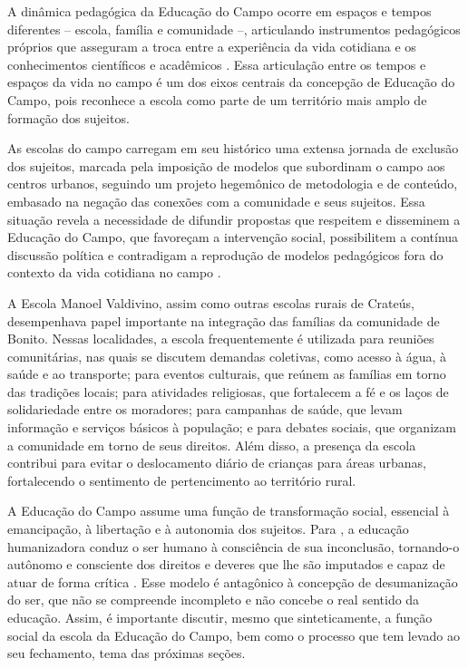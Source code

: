 \documentclass[
  12pt,
  openright,
  twoside,
  a4paper,
  english,
  brazilian,
  sumario=tradicional
]{abntex2}
\begin{document}
A dinâmica pedagógica da Educação do Campo ocorre em espaços e tempos diferentes -- escola, família e comunidade --, articulando instrumentos pedagógicos próprios que asseguram a troca entre a experiência da vida cotidiana e os conhecimentos científicos e acadêmicos \cite{molinafreitas2011}. Essa articulação entre os tempos e espaços da vida no campo é um dos eixos centrais da concepção de Educação do Campo, pois reconhece a escola como parte de um território mais amplo de formação dos sujeitos.

As escolas do campo carregam em seu histórico uma extensa jornada de exclusão dos sujeitos, marcada pela imposição de modelos que subordinam o campo aos centros urbanos, seguindo um projeto hegemônico de metodologia e de conteúdo, embasado na negação das conexões com a comunidade e seus sujeitos. Essa situação revela a necessidade de difundir propostas que respeitem e disseminem a Educação do Campo, que favoreçam a intervenção social, possibilitem a contínua discussão política e contradigam a reprodução de modelos pedagógicos fora do contexto da vida cotidiana no campo \cite{arroyocaldartmolina2011}.

A Escola Manoel Valdivino, assim como outras escolas rurais de Crateús, desempenhava papel importante na integração das famílias da comunidade de Bonito. Nessas localidades, a escola frequentemente é utilizada para reuniões comunitárias, nas quais se discutem demandas coletivas, como acesso à água, à saúde e ao transporte; para eventos culturais, que reúnem as famílias em torno das tradições locais; para atividades religiosas, que fortalecem a fé e os laços de solidariedade entre os moradores; para campanhas de saúde, que levam informação e serviços básicos à população; e para debates sociais, que organizam a comunidade em torno de seus direitos. Além disso, a presença da escola contribui para evitar o deslocamento diário de crianças para áreas urbanas, fortalecendo o sentimento de pertencimento ao território rural.

A Educação do Campo assume uma função de transformação social, essencial à emancipação, à libertação e à autonomia dos sujeitos. Para , a educação humanizadora conduz o ser humano à consciência de sua inconclusão, tornando-o autônomo e consciente dos direitos e deveres que lhe são imputados e capaz de atuar de forma crítica \cite{freire1987,caldart2009}. Esse modelo é antagônico à concepção de desumanização do ser, que não se compreende incompleto e não concebe o real sentido da educação. Assim, é importante discutir, mesmo que sinteticamente, a função social da escola da Educação do Campo, bem como o processo que tem levado ao seu fechamento, tema das próximas seções.
\end{document}
